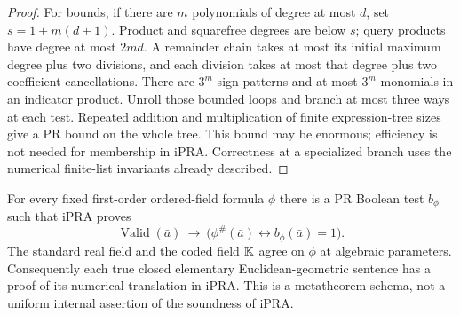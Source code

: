 \begin{proof}
For bounds, if there are $m$ polynomials of degree at most $d$, set
$s=1+m(d+1)$. Product and squarefree degrees are below $s$; query
products have degree at most $2md$. A remainder chain takes at most its
initial maximum degree plus two divisions, and each division takes at most
that degree plus two coefficient cancellations. There are $3^m$ sign
patterns and at most $3^m$ monomials in an indicator product. Unroll those
bounded loops and branch at most three ways at each test. Repeated
addition and multiplication of finite expression-tree sizes give a PR
bound on the whole tree. This bound may be enormous; efficiency is not
needed for membership in iPRA. Correctness at a specialized branch uses
the numerical finite-list invariants already described.
\end{proof}

\begin{theorem}
\label{qe:transfer}
For every fixed first-order ordered-field formula $\phi$ there is a PR
Boolean test $b_\phi$ such that iPRA proves
\[
 \operatorname{Valid}(\bar a)\ \longrightarrow\
      \bigl(\phi^\#(\bar a)\leftrightarrow b_\phi(\bar a)=1\bigr).
\]
The standard real field and the coded field $\mathbb K$ agree on $\phi$ at
algebraic parameters. Consequently each true closed elementary
Euclidean-geometric sentence has a proof of its numerical translation in
iPRA. This is a metatheorem schema, not a uniform internal assertion of
the soundness of iPRA.
\end{theorem}
